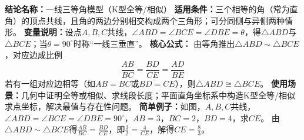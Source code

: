 \textbf{结论名称：}一线三等角模型（K型全等/相似）
\textbf{适用条件：}三个相等的角（常为直角）的顶点共线，且角的两边分别相交构成两个三角形；可分同侧与异侧两种情形。
\textbf{变量说明：}设点$A,B,C$共线，$\angle ABD = \angle BCE = \angle DBE = \theta$，得$\triangle ABD$与$\triangle BCE$；当$\theta=90^\circ$时称“一线三垂直”。
\textbf{核心公式：}
由等角推出$\triangle ABD \sim \triangle BCE$，对应边成比例
\[
\boxed{\frac{AB}{BC} = \frac{BD}{CE} = \frac{AD}{BE}}
\]
若有一组对应边相等（如$AB=BC$或$BD=CE$），则$\triangle ABD \cong \triangle BCE$。
\textbf{使用场景：}几何中证明全等或相似、求线段长度；平面直角坐标系中构造K型全等/相似求点坐标，解决最值与存在性问题。
\textbf{简单例子：}如图，$A,B,C$共线，$\angle ABD=\angle BCE=\angle DBE=90^\circ$，$AB=3$，$BC=2$，$BD=4$，求$CE$。
由$\triangle ABD \sim \triangle BCE$得$\frac{AB}{BC}=\frac{BD}{CE}$，即$\frac{3}{2}=\frac{4}{CE}$，解得$CE=\frac{8}{3}$。